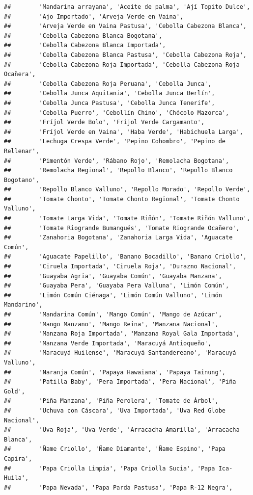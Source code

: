 \documentclass[
]{book}
\begin{document}
\begin{verbatim}
##        'Mandarina arrayana', 'Aceite de palma', 'Ají Topito Dulce',
##        'Ajo Importado', 'Arveja Verde en Vaina',
##        'Arveja Verde en Vaina Pastusa', 'Cebolla Cabezona Blanca',
##        'Cebolla Cabezona Blanca Bogotana',
##        'Cebolla Cabezona Blanca Importada',
##        'Cebolla Cabezona Blanca Pastusa', 'Cebolla Cabezona Roja',
##        'Cebolla Cabezona Roja Importada', 'Cebolla Cabezona Roja Ocañera',
##        'Cebolla Cabezona Roja Peruana', 'Cebolla Junca',
##        'Cebolla Junca Aquitania', 'Cebolla Junca Berlín',
##        'Cebolla Junca Pastusa', 'Cebolla Junca Tenerife',
##        'Cebolla Puerro', 'Cebollín Chino', 'Chócolo Mazorca',
##        'Fríjol Verde Bolo', 'Fríjol Verde Cargamanto',
##        'Fríjol Verde en Vaina', 'Haba Verde', 'Habichuela Larga',
##        'Lechuga Crespa Verde', 'Pepino Cohombro', 'Pepino de Rellenar',
##        'Pimentón Verde', 'Rábano Rojo', 'Remolacha Bogotana',
##        'Remolacha Regional', 'Repollo Blanco', 'Repollo Blanco Bogotano',
##        'Repollo Blanco Valluno', 'Repollo Morado', 'Repollo Verde',
##        'Tomate Chonto', 'Tomate Chonto Regional', 'Tomate Chonto Valluno',
##        'Tomate Larga Vida', 'Tomate Riñón', 'Tomate Riñón Valluno',
##        'Tomate Riogrande Bumangués', 'Tomate Riogrande Ocañero',
##        'Zanahoria Bogotana', 'Zanahoria Larga Vida', 'Aguacate Común',
##        'Aguacate Papelillo', 'Banano Bocadillo', 'Banano Criollo',
##        'Ciruela Importada', 'Ciruela Roja', 'Durazno Nacional',
##        'Guayaba Agria', 'Guayaba Común', 'Guayaba Manzana',
##        'Guayaba Pera', 'Guayaba Pera Valluna', 'Limón Común',
##        'Limón Común Ciénaga', 'Limón Común Valluno', 'Limón Mandarino',
##        'Mandarina Común', 'Mango Común', 'Mango de Azúcar',
##        'Mango Manzano', 'Mango Reina', 'Manzana Nacional',
##        'Manzana Roja Importada', 'Manzana Royal Gala Importada',
##        'Manzana Verde Importada', 'Maracuyá Antioqueño',
##        'Maracuyá Huilense', 'Maracuyá Santandereano', 'Maracuyá Valluno',
##        'Naranja Común', 'Papaya Hawaiana', 'Papaya Tainung',
##        'Patilla Baby', 'Pera Importada', 'Pera Nacional', 'Piña Gold',
##        'Piña Manzana', 'Piña Perolera', 'Tomate de Árbol',
##        'Uchuva con Cáscara', 'Uva Importada', 'Uva Red Globe Nacional',
##        'Uva Roja', 'Uva Verde', 'Arracacha Amarilla', 'Arracacha Blanca',
##        'Ñame Criollo', 'Ñame Diamante', 'Ñame Espino', 'Papa Capira',
##        'Papa Criolla Limpia', 'Papa Criolla Sucia', 'Papa Ica-Huila',
##        'Papa Nevada', 'Papa Parda Pastusa', 'Papa R-12 Negra',

\end{verbatim}
\end{document}
